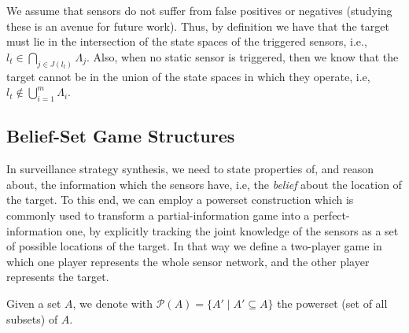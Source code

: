 We assume that sensors do not suffer from  false positives or negatives (studying these is an avenue for future work). Thus, by definition we have that the target must lie in the intersection of the state spaces of the triggered sensors, i.e., $l_t \in \bigcap_{j\in J(l_t)}\Lambda_j$. Also, when no static sensor is triggered,  then we know that the target cannot be in the union of the state spaces in which they operate, i.e, $l_t \notin \bigcup_{i=1}^m \Lambda_i$.


\subsection{Belief-Set Game Structures}\label{sec:belief-gs}

In surveillance strategy synthesis, we need to state properties of, and reason about, the information which the sensors have, i.e, the \emph{belief} about the location of the target. To this end, we can employ a powerset construction which is commonly used to transform a partial-information game into a perfect-information one, by explicitly tracking the joint knowledge of the sensors as a set of possible locations of the target. In that way we define a two-player game in which one player represents the whole sensor network, and the other player represents the target.

Given a set $A$, we denote with $\mathcal{P}(A) = \{A' \mid A'\subseteq A\}$ the powerset (set of all subsets) of $A$.

